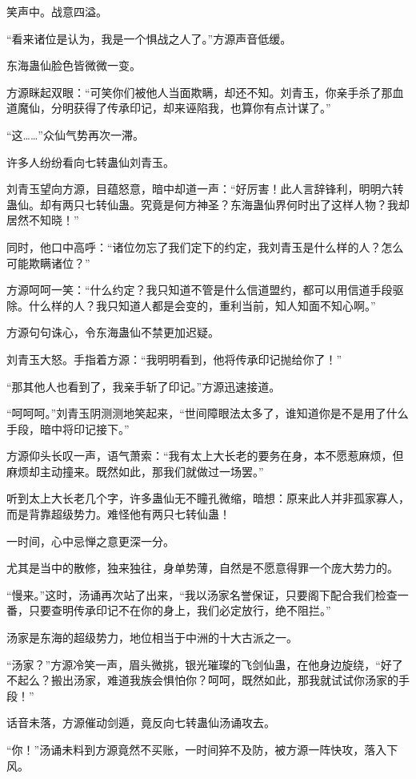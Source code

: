 \begin{this_body}
笑声中。战意四溢。

“看来诸位是认为，我是一个惧战之人了。”方源声音低缓。

东海蛊仙脸色皆微微一变。

方源眯起双眼：“可笑你们被他人当面欺瞒，却还不知。刘青玉，你亲手杀了那血道魔仙，分明获得了传承印记，却来诬陷我，也算你有点计谋了。”

“这……”众仙气势再次一滞。

许多人纷纷看向七转蛊仙刘青玉。

刘青玉望向方源，目蕴怒意，暗中却道一声：“好厉害！此人言辞锋利，明明六转蛊仙。却有两只七转仙蛊。究竟是何方神圣？东海蛊仙界何时出了这样人物？我却居然不知晓！”

同时，他口中高呼：“诸位勿忘了我们定下的约定，我刘青玉是什么样的人？怎么可能欺瞒诸位？”

方源呵呵一笑：“什么约定？我只知道不管是什么信道盟约，都可以用信道手段驱除。什么样的人？我只知道人都是会变的，重利当前，知人知面不知心啊。”

方源句句诛心，令东海蛊仙不禁更加迟疑。

刘青玉大怒。手指着方源：“我明明看到，他将传承印记抛给你了！”

“那其他人也看到了，我亲手斩了印记。”方源迅速接道。

“呵呵呵。”刘青玉阴测测地笑起来，“世间障眼法太多了，谁知道你是不是用了什么手段，暗中将印记接下。”

方源仰头长叹一声，语气萧索：“我有太上大长老的要务在身，本不愿惹麻烦，但麻烦却主动撞来。既然如此，那我们就做过一场罢。”

听到太上大长老几个字，许多蛊仙无不瞳孔微缩，暗想：原来此人并非孤家寡人，而是背靠超级势力。难怪他有两只七转仙蛊！

一时间，心中忌惮之意更深一分。

尤其是当中的散修，独来独往，身单势薄，自然是不愿意得罪一个庞大势力的。

“慢来。”这时，汤诵再次站了出来，“我以汤家名誉保证，只要阁下配合我们检查一番，只要查明传承印记不在你的身上，我们必定放行，绝不阻拦。”

汤家是东海的超级势力，地位相当于中洲的十大古派之一。

“汤家？”方源冷笑一声，眉头微挑，银光璀璨的飞剑仙蛊，在他身边旋绕，“好了不起么？搬出汤家，难道我族会惧怕你？呵呵，既然如此，那我就试试你汤家的手段！”

话音未落，方源催动剑遁，竟反向七转蛊仙汤诵攻去。

“你！”汤诵未料到方源竟然不买账，一时间猝不及防，被方源一阵快攻，落入下风。


\end{this_body}

